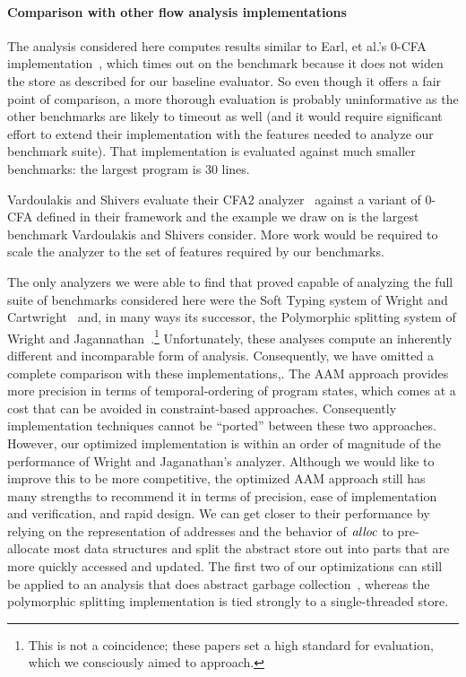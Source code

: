\documentclass[preprint,onecolumn,9pt]{sigplanconf} %
\begin{document}
\paragraph{Comparison with other flow analysis implementations}

The analysis considered here computes results similar to Earl, et al.'s
0-CFA implementation~\cite{dvanhorn:Earl2012Introspective}, which
times out on the \Church{} benchmark because it does not widen the
store as described for our baseline evaluator.  So even though it
offers a fair point of comparison, a more thorough evaluation is
probably uninformative as the other benchmarks are likely to timeout
as well (and it would require significant effort to extend their
implementation with the features needed to analyze our benchmark
suite).  That implementation is evaluated against much smaller
benchmarks: the largest program is 30 lines.

Vardoulakis and Shivers evaluate their CFA2
analyzer~\cite{dvanhorn:Vardoulakis2011CFA2} against a variant of
0-CFA defined in their framework and the example we draw on is the
largest benchmark Vardoulakis and Shivers consider.  More work would
be required to scale the analyzer to the set of features required by
our benchmarks.

The only analyzers we were able to find that proved capable of
analyzing the full suite of benchmarks considered here were the Soft
Typing system of Wright and
Cartwright~\cite{dvanhorn:Wright1997Practical} and, in many ways its
successor, the Polymorphic splitting system of Wright and
Jagannathan~\cite{dvanhorn:wright-jagannathan-toplas98}.\footnote{This
  is not a coincidence; these papers set a high standard for
  evaluation, which we consciously aimed to approach.}  Unfortunately,
these analyses compute an inherently different and incomparable form
of analysis.  Consequently, we have omitted a complete comparison with
these implementations,.  The AAM approach provides more precision in
terms of temporal-ordering of program states, which comes at a cost
that can be avoided in constraint-based approaches.  Consequently
implementation techniques cannot be ``ported'' between these two
approaches.  However, our optimized implementation is within an order
of magnitude of the performance of Wright and Jaganathan's analyzer.
Although we would like to improve this to be more competitive, the
optimized AAM approach still has many strengths to recommend it in
terms of precision, ease of implementation and verification, and rapid
design. We can get closer to their performance by relying on the
representation of addresses and the behavior of $\mathit{alloc}$ to
pre-allocate most data structures and split the abstract store out
into parts that are more quickly accessed and updated. The first two
of our optimizations can still be applied to an analysis that does
abstract garbage collection~\cite{dvanhorn:Might:2006:GammaCFA},
whereas the polymorphic splitting implementation is tied strongly to a
single-threaded store.
\end{document}

